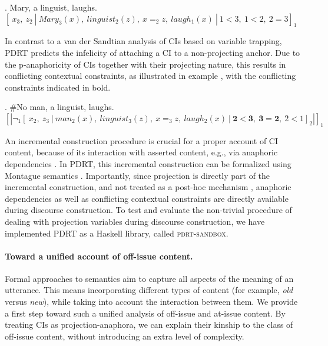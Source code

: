 \documentclass[a4paper,12pt]{article}
\begin{document}
\vspace{-0.25cm}
\ex.  Mary, a linguist, laughs.\\
{\small 
  $[~x_3,~z_2~
   |~Mary_3(x),~linguist_2(z),~x=_2z,~laugh_1(x)~
 |~1 < 3,~1 < 2,~2=3]_1$
}

\vspace{-0.25cm}\noindent In contrast to a van der Sandtian analysis of CIs
based on variable trapping, PDRT predicts the infelicity of attaching a CI
to a non-projecting anchor. Due to the p-anaphoricity of CIs together with
their projecting nature, this results in conflicting contextual constraints,
as illustrated in example \Next, with the conflicting constraints
indicated in bold.

\vspace{-0.25cm}
\ex. \#No man, a linguist, laughs.\\
{\small 
  $[|\neg_1[~x_2,~z_3~
   |~man_2(x),~linguist_3(z),~x=_3z,~laugh_2(x)~
   |{\mathbf{~2 < 3,~3 = 2}},~2 < 1]_2|]_1$
}

\vspace{-0.25cm} \noindent An incremental construction procedure is crucial
for a proper account of CI content, because of its interaction with asserted
content, e.g., via anaphoric dependencies \citep{anderbois2010crossing}.  In
PDRT, this incremental construction can be formalized using Montague
semantics \citep[cf.][]{muskens1996combining}.  Importantly, since
projection is directly part of the incremental construction, and not treated
as a post-hoc mechanism \citep[as in][]{sandt1992presupposition-short},
anaphoric dependencies as well as conflicting contextual constraints are
directly available during discourse construction. To test and evaluate the
non-trivial procedure of dealing with projection variables during discourse
construction, we have implemented PDRT as a Haskell library, called
\textsc{pdrt-sandbox}.


\vspace{-0.4cm} \paragraph{Toward a unified account of off-issue content.}
Formal approaches to semantics aim to capture all aspects of the meaning of
an utterance. This means incorporating different types of content (for
example, \emph{old} versus \emph{new}), while taking into account the
interaction between them. We provide a first step toward such a unified
analysis of off-issue and at-issue content. By treating CIs as
projection-anaphora, we can explain their kinship to the class of off-issue
content, without introducing an extra level of complexity.

\footnotesize

 
 
\end{document}
